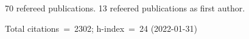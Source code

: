70 refereed publications. 13 refeered publications as first author.

Total citations~=~2302; h-index~=~24 (2022-01-31)